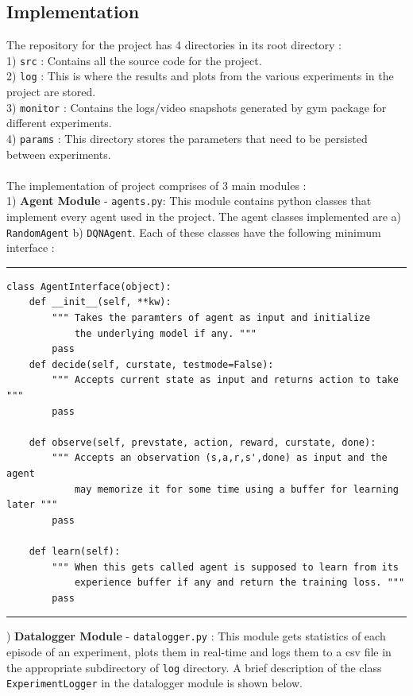 \documentclass{article}
\begin{document}
\subsection*{Implementation}
The repository for the project has 4 directories in its root directory :\\ 
1) \texttt{src} : Contains all the source code for the project.\\
2) \texttt{log} : This is where the results and plots from the various experiments in the project are stored.\\
3) \texttt{monitor} : Contains the logs/video snapshots generated by gym package for different experiments.\\
4) \texttt{params} : This directory stores the parameters that need to be persisted between experiments.\\\\
The implementation of project comprises of 3 main modules :\\
1) \textbf{Agent Module} - \texttt{agents.py}: This module contains python classes that implement every agent used in the project. The agent classes implemented are a) \texttt{RandomAgent} b) \texttt{DQNAgent}. Each of these classes have the following minimum interface :\\
\hrule
\begin{verbatim}
class AgentInterface(object):
    def __init__(self, **kw):
        """ Takes the paramters of agent as input and initialize 
            the underlying model if any. """
        pass
    def decide(self, curstate, testmode=False):
        """ Accepts current state as input and returns action to take """
        pass

    def observe(self, prevstate, action, reward, curstate, done):
        """ Accepts an observation (s,a,r,s',done) as input and the agent 
            may memorize it for some time using a buffer for learning later """
        pass

    def learn(self):
        """ When this gets called agent is supposed to learn from its 
            experience buffer if any and return the training loss. """
        pass
\end{verbatim}
\hrule
{}) \textbf{Datalogger Module} - \texttt{datalogger.py} : This module gets statistics of each episode of an experiment, plots them in real-time and logs them to a csv file in the appropriate subdirectory of \texttt{log} directory. A brief description of the class \texttt{ExperimentLogger} in the datalogger module is shown below.\\
\end{document}
